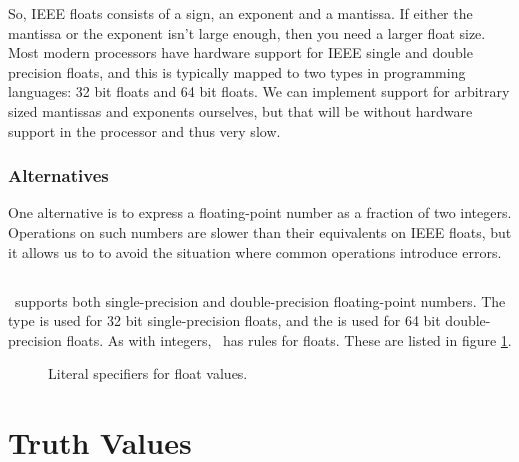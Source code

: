 So, IEEE floats consists of a sign, an exponent and a mantissa. If either the mantissa or the exponent isn't large enough, then you need a larger float size. Most modern processors have hardware support for IEEE single and double precision floats, and this is typically mapped to two types in programming languages: 32 bit floats and 64 bit floats. We can implement support for arbitrary sized mantissas and exponents ourselves, but that will be without hardware support in the processor and thus very slow.

\subsubsection{Alternatives}

One alternative is to express a floating-point number as a fraction of two integers. Operations on such numbers are slower than their equivalents on IEEE floats, but it allows us to to avoid the situation where common operations introduce errors.

\subsection{\csharp}

\csharp\ supports both single-precision and double-precision floating-point numbers. The  type is used for 32 bit single-precision floats, and the  is used for 64 bit double-precision floats. As with integers, \csharp\ has  rules for floats. These are listed in figure \ref{fig:primitives:float:literals}.

\begin{figure}[tbp]
  
  \caption{Literal specifiers for float values.}
  \label{fig:primitives:float:literals}
\end{figure}



\section{Truth Values}
\label{primitives:bools}

